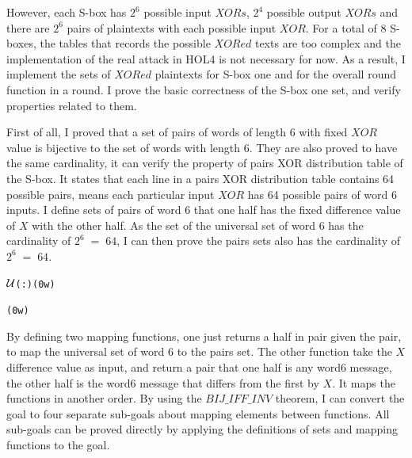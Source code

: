 \documentclass{article}
\begin{document}
\begin{alltt}
  
\end{alltt}

However, each S-box has $2^6$ possible input $XORs$, $2^4$ possible output $XORs$ and there are $2^6$ pairs of plaintexts
with each possible input $XOR$. For a total of 8 S-boxes, the tables that records the possible $XORed$ texts are too
complex and the implementation of the real attack in HOL4 is not necessary for now. As a result, I implement the sets of $XORed$
plaintexts for S-box one and for the overall round function in a round. I prove the basic correctness of the S-box one
set, and verify properties related to them.

First of all, I proved that a set of pairs of words of length 6 with fixed $XOR$ value is bijective to the set of
words with length 6. They are also proved to have the same cardinality, it can verify the property of pairs XOR distribution
table of
the S-box. It states that each line in a pairs XOR distribution table contains 64 possible pairs, means each particular
input $XOR$ has 64 possible pairs of word 6 inputs. I define
sets of pairs of word 6 that one half has the fixed difference value of $X$ with the other half. As the set of
the universal set of word 6 has the cardinality of $2^6\;=\;64$, I can then prove the pairs sets also has the cardinality
of $2^6\;=\;64$.

\begin{alltt}
  
\end{alltt}

\begin{alltt}
  \HOLTokenTurnstile{}   \ensuremath{{\cal{U}}}(:) ( 0w)
\end{alltt}

\begin{alltt}
  \HOLTokenTurnstile{}  ( 0w) \HOLSymConst{=}  \HOLSymConst{\HOLTokenExp{}} 
\end{alltt}

By defining two mapping functions, one just returns a half in pair given the pair, to map the universal set of word 6 to
the pairs set. The other function take the $X$ difference value as input, and return a pair that one half is any word6 message,
the other half is the word6 message that differs from the first by $X$. It maps the functions in another order. By using
the $BIJ\_IFF\_INV$ theorem, I can convert the goal to four separate sub-goals about mapping elements between functions.
All sub-goals can be proved directly by applying the definitions of sets and mapping functions to the goal.
\end{document}
